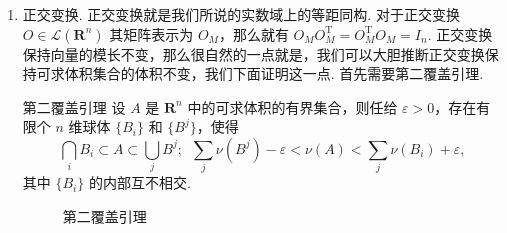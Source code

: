 \begin{enumerate}[label=(\arabic*)]
          \begin{proof}
              对于一个包含 $A$ 的一个矩形 $I$，首先可以定义一个示性函数 $\chi_A$，满足
              \[\chi(x) = \begin{cases}
                      1, & x\in A,    \\
                      0, & x\notin A.
                  \end{cases}\]
              这样 $A$ 的体积就可以表示为 $\nu(A) = \displaystyle\int_I\chi_A$. 因此对于任意的 $\varepsilon >0$，存在 $I$ 的分割 $\pi = \{I_{ij}\}$ 使得\[\left\lvert \sum_{ij}\chi_A(\xi_{ij})\nu(I_{ij}) - \nu(A)\right\rvert < \varepsilon,\enspace \forall \xi_{ij}\in I_{ij}.\]
              根据示性函数的定义，有 \[\sum_{ij}\inf_{\xi_{ij}\in I_{ij}}\chi_A(\xi_{ij})\nu(I_{ij}) = \sum_{I_{ij}\subset A}\nu(I_{ij}),\]
              所以，对于分割 $\pi$ 就有 \[\nu(A) - \varepsilon < \sum_{I_{ij}\subset A}\nu(I_{ij}) \leqslant \nu(A).\]
              同理可以有 \[\sum_{ij}\sup_{\xi_{ij}\in I_{ij}}\chi_A(\xi_{ij})\nu(I_{ij}) = \sum_{I_{ij}\cap A\neq \varnothing}\nu(I_{ij}),\]
              此时就有 \[\nu(A) < \sum_{I_{ij}\cap A\neq \varnothing}\nu(I_{ij}) < \nu(A) + \varepsilon.\]
              这就证明了第一覆盖引理，其中结论中的 $\{I_i\}$ 是 $I_{ij}\subset A$ 的那些 $I_{ij}$，$\{J_j\}$ 是 $I_{ij}\cap A\neq \varnothing$ 的那些 $I_{ij}$.
          \end{proof}

          这个证明的一个副产品就是：这些内部与 $\partial A$ 有非空交集的矩形的体积之和不会超过 $2\varepsilon$，这个结论也不失为一个良好的放缩.

    \item 正交变换. 正交变换就是我们所说的实数域上的等距同构. 对于正交变换 $O\in \mathcal{L}(\mathbf{R}^n)$ 其矩阵表示为 $O_M$，那么就有 $O_MO^\mathrm{T}_M = O_M^\mathrm{T}O_M = I_n$. 正交变换保持向量的模长不变，那么很自然的一点就是，我们可以大胆推断正交变换保持可求体积集合的体积不变，我们下面证明这一点. 首先需要第二覆盖引理.

          \begin{lemma}{第二覆盖引理}{}
              设 $A$ 是 $\mathbf{R}^n$ 中的可求体积的有界集合，则任给 $\varepsilon>0$，存在有限个 $n$ 维球体 $\{B_i\}$ 和 $\{B^j\}$，使得 \[\bigcap_iB_i\subset A \subset \bigcup_jB^j;\enspace \sum_j\nu(B^j) - \varepsilon < \nu(A) < \sum_j\nu(B_i) + \varepsilon,\]
              其中 $\{B_i\}$ 的内部互不相交.
          \end{lemma}

          \begin{figure}[h]
              \centering
              \caption{第二覆盖引理}
          \end{figure}


\end{enumerate}
